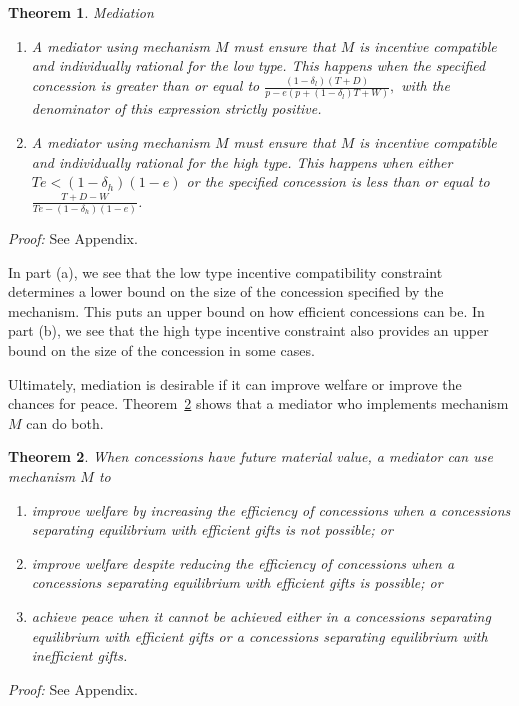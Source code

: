 \documentclass[12pt, letterpaper]{article}
\newcommand{\de}{\delta}
\newtheorem{theorem}{Theorem}
\begin{document}
\begin{theorem}
\emph{Mediation}
\begin{enumerate}
		\item[(a)] A mediator using mechanism $M$ must ensure that $M$ is incentive compatible and individually rational for the low type. This happens when the specified concession is greater than or equal to $\frac{\left(1 - \de_l \right)\left(T +D \right)}{p - e\left(p +(1-\de_l)T +W \right)},$ with the denominator of this expression strictly positive.
		\item[(b)] A mediator using mechanism $M$ must ensure that $M$ is incentive compatible and individually rational for the high type. This happens when either $Te < (1-\de_h)(1-e)$ or the specified concession is less than or equal to $\frac{ T + D - W}{Te - (1-\de_h)(1-e)}$.
\end{enumerate}
	\label{theorem:med}
\end{theorem}
\emph{Proof:} See Appendix.

In part (a), we see that the low type incentive compatibility constraint determines a lower bound on the size of the concession specified by the mechanism. This puts an upper bound on how efficient concessions can be. In part (b), we see that the high type incentive constraint also provides an upper bound on the size of the concession in some cases.

Ultimately, mediation is desirable if it can improve welfare or improve the chances for peace. Theorem~\ref{theorem:medwel} shows that a mediator who implements mechanism $M$ can do both.

\begin{theorem}
	When concessions have future material value, a mediator can use mechanism $M$ to
	\begin{enumerate}
		\item[(a)] improve welfare by increasing the efficiency of concessions when a \emph{concessions separating equilibrium with efficient gifts} is not possible; or
		\item[(b)] improve welfare despite reducing the efficiency of concessions when a \emph{concessions separating equilibrium with efficient gifts} is possible; or
		\item[(c)] achieve peace when it cannot be achieved either in a \emph{concessions separating equilibrium with efficient gifts} or a \emph{concessions separating equilibrium with inefficient gifts}.
	\end{enumerate}
	\label{theorem:medwel}
\end{theorem}
\emph{Proof:} See Appendix.
\end{document}
